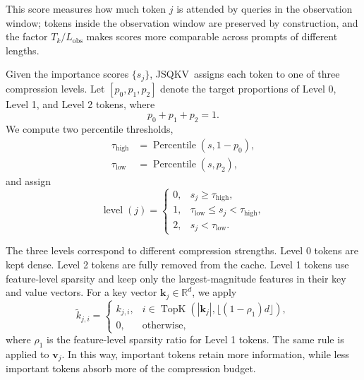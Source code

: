 \documentclass[runningheads]{llncs}
\newcommand{\method}{JSQKV}
\begin{document}
This score measures how much token $j$ is attended by queries in the observation window; tokens inside the observation window are preserved by construction, and the factor $T_k/L_{\text{obs}}$ makes scores more comparable across prompts of different lengths.

Given the importance scores $\{s_j\}$, \method\ assigns each token to one of three compression levels. Let $[p_0, p_1, p_2]$ denote the target proportions of Level 0, Level 1, and Level 2 tokens, where
\begin{equation}
p_0 + p_1 + p_2 = 1.
\end{equation}
We compute two percentile thresholds,
\begin{align}
\tau_{\text{high}} &= \operatorname{Percentile}(s, 1 - p_0), \\
\tau_{\text{low}}  &= \operatorname{Percentile}(s, p_2),
\end{align}
and assign
\begin{equation}
\operatorname{level}(j) =
\begin{cases}
0, & s_j \geq \tau_{\text{high}}, \\
1, & \tau_{\text{low}} \leq s_j < \tau_{\text{high}}, \\
2, & s_j < \tau_{\text{low}}.
\end{cases}
\end{equation}

The three levels correspond to different compression strengths. Level 0 tokens are kept dense. Level 2 tokens are fully removed from the cache. Level 1 tokens use feature-level sparsity and keep only the largest-magnitude features in their key and value vectors. For a key vector $\mathbf{k}_j \in \mathbb{R}^{d}$, we apply
\begin{equation}
\tilde{k}_{j,i} =
\begin{cases}
k_{j,i}, & i \in \operatorname{TopK}\!\left(|\mathbf{k}_j|,\lfloor (1-\rho_1)d \rfloor\right), \\
0, & \text{otherwise},
\end{cases}
\end{equation}
where $\rho_1$ is the feature-level sparsity ratio for Level 1 tokens. The same rule is applied to $\mathbf{v}_j$. In this way, important tokens retain more information, while less important tokens absorb more of the compression budget.
\end{document}
